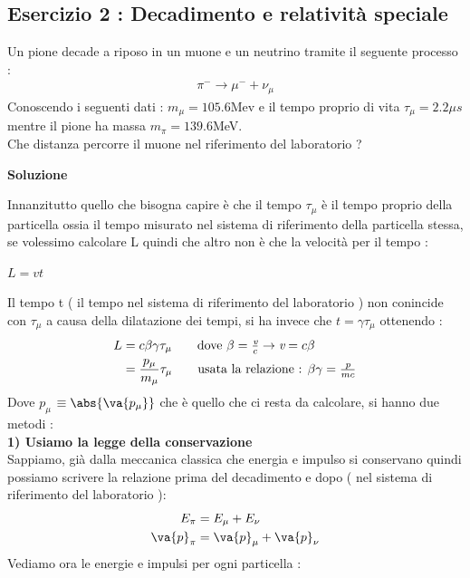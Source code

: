 \documentclass[a4paper, 12pt, twoside]{report}
\begin{document}
\subsection{Esercizio 2 : Decadimento e relatività speciale}
Un pione decade a riposo in un muone e un neutrino tramite il seguente processo : 
\begin{align*}
    \pi^{-} \rightarrow \mu^{-} + \nu_{\mu}
\end{align*}
Conoscendo i seguenti dati : $m_{\mu} = 105.6$Mev e il tempo proprio di vita $\tau_{\mu} = 2.2\mu s$ mentre il 
pione ha massa $m_{\pi} = 139.6$MeV.\\ 
Che distanza percorre il muone nel riferimento del laboratorio ? \\
\begin{center}{\textbf{Soluzione}}\end{center}
Innanzitutto quello che bisogna capire è che il tempo $\tau_{\mu}$ è il tempo proprio della particella ossia il tempo 
misurato nel sistema di riferimento della particella stessa, se volessimo calcolare L quindi che altro non è che la 
velocità per il tempo :\\
\begin{center} $L = \textit{v}t$\end{center}
Il tempo t ( il tempo nel sistema di riferimento del laboratorio ) non conincide con $\tau_{\mu}$ a causa della dilatazione dei tempi, 
si ha invece che $t=\gamma\tau_{\mu}$ ottenendo : 
\begin{align*}
        L &= c\beta\gamma\tau_{\mu}  \tag*{dove $\beta = \frac{\textit{v}}{c} \rightarrow \textit{v} = c\beta$} \\
          &= \frac{\textit{$p_{\mu}$}}{m_{\mu}}\tau_{\mu} \tag*{usata la relazione : $\beta\gamma = \frac{\textit{p}}{mc}$}
\end{align*}
Dove \textit{$p_{\mu}$} $\equiv \abs{\va{p_{\mu}}}$ che è quello che ci resta da calcolare, si hanno due metodi : \\
\textbf{1) Usiamo la legge della conservazione} \\
Sappiamo, già dalla meccanica classica che energia e impulso si conservano quindi possiamo scrivere la relazione prima del decadimento
e dopo ( nel sistema di riferimento del laboratorio ): 
\begin{align*}
        E_{\pi} &= E_{\mu} + E_{\nu} \\
        \va{p}_{\pi} &= \va{p}_{\mu} + \va{p}_{\nu}
\end{align*}
Vediamo ora le energie e impulsi per ogni particella : \\
\end{document}
